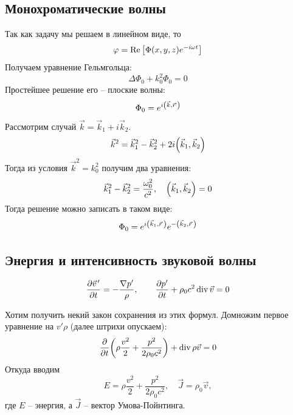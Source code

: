 \subsection{Монохроматические волны}
Так как задачу мы решаем в линейном виде, то 
\begin{equation}
    \varphi = \Re\qty[\Phi(x,y,z)e^{-i\omega t}]
\end{equation}
Получаем уравнение Гельмгольца:
\begin{equation}
    \Delta \Phi_0+k_0^2 \Phi_0 = 0
\end{equation}
Простейшее решение его -- плоские волны:
\begin{equation}
    \Phi_0 = e^{i\qty(\vec{k}, \vec{r}\,)}
\end{equation}
Рассмотрим случай $\vec{k} = \vec{k}_1 + i\vec{k}_2$.
\begin{equation}
    \vec{k}^2 = \vec{k}_1^2 - \vec{k}_2^2 +2i \qty(\vec{k}_1,\vec{k}_2)
\end{equation}
Тогда из условия $\vec{k}^2 = k_0^2$ получим два уравнения:
\begin{equation}
    \vec{k}_1^2-\vec{k}_2^2 = \frac{\omega_0^2}{c^2}, \quad
    \qty(\vec{k}_1,\vec{k}_2)=0
\end{equation}
Тогда решение можно записать в таком виде:
\begin{equation}
    \Phi_0 = e^{i\qty(\vec{k}_1, \vec{r}\,)}e^{-\qty(\vec{k}_2,\vec{r}\,)}
\end{equation}


\subsection{Энергия и интенсивность звуковой волны}

\begin{equation}
    \pdv{\pvec{v}'}{t} = -\frac{\nabla p'}{\rho}, \qquad
    \pdv{p'}{t} +\rho_0 c^2 \Div \vec{v} = 0
\end{equation}

Хотим получить некий закон сохранения из этих формул. Домножим первое 
уравнение на $v' \rho$ (далее штрихи опускаем):
\begin{equation}
    \pdv{t}\qty(
        \rho \frac{v^2}{2} + \frac{p^2}{2\rho_0 c^2})
 + \operatorname{div} \rho \vec{v} = 0
\end{equation}
Откуда вводим
\begin{equation}
    E = \rho \frac{v^2}{2} + \frac{p^2}{2\rho_0 c^2}, \quad
    \vec{J} = \rho_0 \vec{v},
\end{equation}
где $E$ -- энергия, а $\vec{J}$ -- вектор Умова-Пойнтинга.


